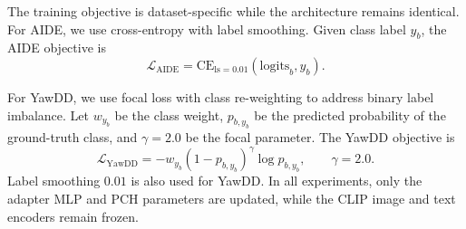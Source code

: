 The training objective is dataset-specific while the architecture remains identical. For AIDE, we use cross-entropy with label smoothing. Given class label $y_b$, the AIDE objective is
\begin{equation}
    \mathcal{L}_{\mathrm{AIDE}} = \mathrm{CE}_{\mathrm{ls}=0.01}(\mathrm{logits}_{b}, y_b).
    \label{eq:aide_loss}
\end{equation}

For YawDD, we use focal loss with class re-weighting to address binary label imbalance. Let $w_{y_b}$ be the class weight, $p_{b,y_b}$ be the predicted probability of the ground-truth class, and $\gamma=2.0$ be the focal parameter. The YawDD objective is
\begin{equation}
    \mathcal{L}_{\mathrm{YawDD}} = - w_{y_b} (1 - p_{b,y_b})^{\gamma} \log p_{b,y_b},
    \qquad \gamma=2.0.
    \label{eq:yawdd_focal_loss}
\end{equation}
Label smoothing $0.01$ is also used for YawDD. In all experiments, only the adapter MLP and PCH parameters are updated, while the CLIP image and text encoders remain frozen.
